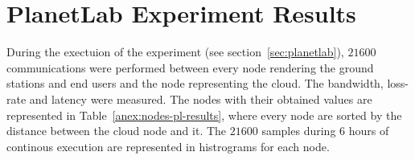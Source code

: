 
\section{PlanetLab Experiment Results}

During the exectuion of the \pl experiment (see section~\ref{sec:planetlab}), $21600$ communications were
performed between every node rendering the ground stations and end users and the
node representing the cloud.
The bandwidth, loss-rate and latency were
measured. The nodes with their obtained values are represented in Table~\ref{anex:nodes-pl-results},
where every node are sorted by the distance between the cloud node and it.
The $21600$ samples during 6 hours of continous execution are represented in
histrograms for each node.





